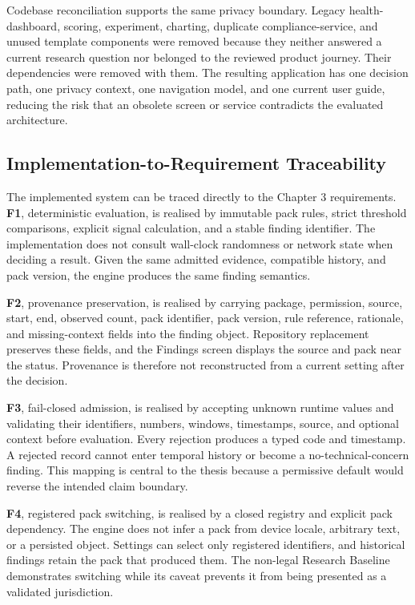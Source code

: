 Codebase reconciliation supports the same privacy boundary. Legacy health-dashboard, scoring, experiment, charting, duplicate compliance-service, and unused template components were removed because they neither answered a current research question nor belonged to the reviewed product journey. Their dependencies were removed with them. The resulting application has one decision path, one privacy context, one navigation model, and one current user guide, reducing the risk that an obsolete screen or service contradicts the evaluated architecture.

\subsection{Implementation-to-Requirement Traceability}

The implemented system can be traced directly to the Chapter 3 requirements. \textbf{F1}, deterministic evaluation, is realised by immutable pack rules, strict threshold comparisons, explicit signal calculation, and a stable finding identifier. The implementation does not consult wall-clock randomness or network state when deciding a result. Given the same admitted evidence, compatible history, and pack version, the engine produces the same finding semantics.

\textbf{F2}, provenance preservation, is realised by carrying package, permission, source, start, end, observed count, pack identifier, pack version, rule reference, rationale, and missing-context fields into the finding object. Repository replacement preserves these fields, and the Findings screen displays the source and pack near the status. Provenance is therefore not reconstructed from a current setting after the decision.

\textbf{F3}, fail-closed admission, is realised by accepting unknown runtime values and validating their identifiers, numbers, windows, timestamps, source, and optional context before evaluation. Every rejection produces a typed code and timestamp. A rejected record cannot enter temporal history or become a no-technical-concern finding. This mapping is central to the thesis because a permissive default would reverse the intended claim boundary.

\textbf{F4}, registered pack switching, is realised by a closed registry and explicit pack dependency. The engine does not infer a pack from device locale, arbitrary text, or a persisted object. Settings can select only registered identifiers, and historical findings retain the pack that produced them. The non-legal Research Baseline demonstrates switching while its caveat prevents it from being presented as a validated jurisdiction.

